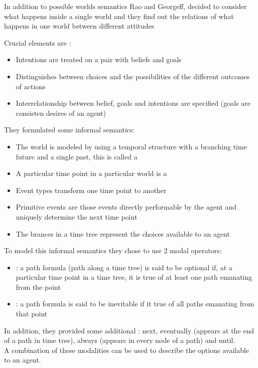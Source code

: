 In addition to possible worlds semantics Rao and Georgeff, decided to consider what happens inside a single world and they find out the relations of what happens in one world between different attitudes


Crucial elements are :
\begin{itemize}
\item Intentions are treated on a pair with beliefs and goals
\item Distinguishes between choices and the possibilities of the different outcomes of actions
\item Interrelationship between belief, goals and intentions are specified (goals are consisten desires of an agent)
\end{itemize}

They formulated some informal semantics:
\begin{itemize}
\item The world is modeled by using a temporal structure with a branching time future and a single past, this is called a 
\item A particular time point in a particular world is a 
\item Event types transform one time point to another
\item Primitive events are those events directly performable by the agent and uniquely determine the next time point
\item The brances in a time tree represent the choices available to an agent
\end{itemize}
To model this informal semantics they chose to use 2 modal operators:
\begin{itemize}
\item {}: a path formula (path along a time tree) is said to be optional if, at a particular time point in a time tree, it is true of at least one path emanating from the point
\item {}: a path formula is said to be inevitable if it true of all paths emanating from that point
\end{itemize}
In addition, they provided some additional : next, eventually (appears at the end of a path in time tree), always (appears in every node of a path) and until.\\
A combination of these modalities can be used to describe the options available to an agent.\\


